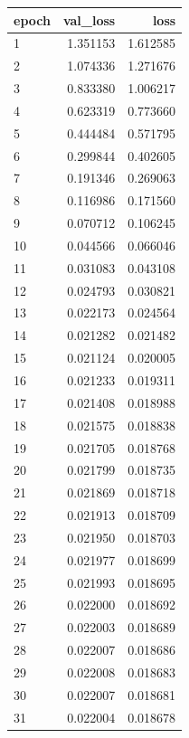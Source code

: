 \begin{table}
  \begin{center}
    \begin{tabular}{lrr}
      \toprule
      epoch &  val\_loss &      loss \\
      \midrule
      1  &  1.351153 &  1.612585 \\
      2  &  1.074336 &  1.271676 \\
      3  &  0.833380 &  1.006217 \\
      4  &  0.623319 &  0.773660 \\
      5  &  0.444484 &  0.571795 \\
      6  &  0.299844 &  0.402605 \\
      7  &  0.191346 &  0.269063 \\
      8  &  0.116986 &  0.171560 \\
      9  &  0.070712 &  0.106245 \\
      10  &  0.044566 &  0.066046 \\
      11 &  0.031083 &  0.043108 \\
      12 &  0.024793 &  0.030821 \\
      13 &  0.022173 &  0.024564 \\
      14 &  0.021282 &  0.021482 \\
      15 &  0.021124 &  0.020005 \\
      16 &  0.021233 &  0.019311 \\
      17 &  0.021408 &  0.018988 \\
      18 &  0.021575 &  0.018838 \\
      19 &  0.021705 &  0.018768 \\
      20 &  0.021799 &  0.018735 \\
      21 &  0.021869 &  0.018718 \\
      22 &  0.021913 &  0.018709 \\
      23 &  0.021950 &  0.018703 \\
      24 &  0.021977 &  0.018699 \\
      25 &  0.021993 &  0.018695 \\
      26 &  0.022000 &  0.018692 \\
      27 &  0.022003 &  0.018689 \\
      28 &  0.022007 &  0.018686 \\
      29 &  0.022008 &  0.018683 \\
      30 &  0.022007 &  0.018681 \\
      31 &  0.022004 &  0.018678 \\

\end{tabular}
\end{center}
\end{table}
